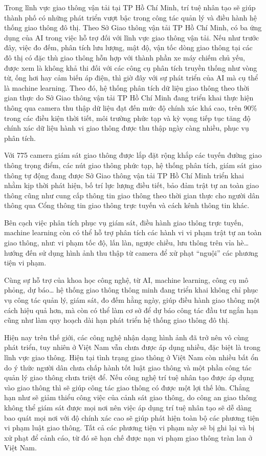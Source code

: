 \documentclass[14pt,oneside,a4paper]{extreport}
\begin{document}
Trong lĩnh vực giao thông vận tải tại TP Hồ Chí Minh, trí tuệ nhân tạo sẽ giúp thành phố có những phát triển vượt bậc trong công tác quản lý và điều hành hệ thống giao thông đô thị. Theo Sở Giao thông vận tải TP Hồ Chí Minh, có ba ứng dụng của AI trong việc hỗ trợ đối với lĩnh vực giao thông vận tải. Nếu như trước đây, việc đo đếm, phân tích lưu lượng, mật độ, vận tốc dòng giao thông tại các đô thị có đặc thù giao thông hỗn hợp với thành phần xe máy chiếm chủ yếu, được xem là không khả thi đối với các công cụ phân tích truyền thống như vòng từ, ống hơi hay cảm biến áp điện, thì giờ đây với sự phát triển của AI mà cụ thể là machine learning. Theo đó, hệ thống phân tích dữ liệu giao thông theo thời gian thực do Sở Giao thông vận tải TP Hồ Chí Minh đang triển khai thực hiện thông qua camera thu thập dữ liệu đạt đến mức độ chính xác khá cao, trên 90\% trong các điều kiện thời tiết, môi trường phức tạp và kỳ vọng tiếp tục tăng độ chính xác dữ liệu hành vi giao thông được thu thập ngày càng nhiều, phục vụ phân tích.

Với 775 camera giám sát giao thông được lắp đặt rộng khắp các tuyến đường giao thông trọng điểm, các nút giao thông phức tạp, hệ thống phân tích, giám sát giao thông tự động đang được Sở Giao thông vận tải TP Hồ Chí Minh triển khai nhằm kịp thời phát hiện, bố trí lực lượng điều tiết, bảo đảm trật tự an toàn giao thông cũng như cung cấp thông tin giao thông theo thời gian thực cho người dân thông qua Cổng thông tin giao thông trực tuyến và cách kênh thông tin khác.

Bên cạch việc phân tích phục vụ giám sát, điều hành giao thông trực tuyến, machine learning còn có thể hỗ trợ phân tích các hành vi vi phạm trật tự an toàn giao thông, như: vi phạm tốc độ, lấn làn, ngược chiều, lưu thông trên vỉa hè… hướng đến sử dụng hình ảnh thu thập từ camera để xử phạt “nguội” các phương tiện vi phạm.

Cùng sự hỗ trợ của khoa học công nghệ, từ AI, machine learning, công cụ mô phỏng, dự báo… hệ thống giao thông thông minh đang triển khai không chỉ phục vụ công tác quản lý, giám sát, đo đếm hằng ngày, giúp điều hành giao thông một cách hiệu quả hơn, mà còn có thể làm cơ sở để dự báo công tác đầu tư ngắn hạn cũng như làm quy hoạch dài hạn phát triển hệ thống giao thông đô thị.

Hiện nay trên thế giới, các công nghệ nhận dạng hình ảnh đã trở nên vô cùng phát triển, tuy nhiên ở Việt Nam vẫn chưa được áp dụng nhiều, đặc biệt là trong lĩnh vực giao thông. Hiện tại tình trạng giao thông ở Việt Nam còn nhiều bất ổn do ý thức người dân chưa chấp hành tốt luật giao thông và một phần công tác quản lý giao thông chưa triệt để. Nếu công nghệ trí tuệ nhân tạo được áp dụng vào giao thông thì sẽ giúp công tác giao thông có được một lợi thế lớn. Chẳng hạn như sẽ giảm thiểu công việc của cảnh sát giao thông, do công an giao thông không thể giám sát được mọi nơi nên việc áp dụng trí tuệ nhân tạo sẽ dễ dàng bao quát mọi nơi với độ chính xác cao sẽ giúp phát hiện toàn bộ các phương tiện vi phạm luật giao thông. Tất cả các phương tiện vi phạm này sẽ bị ghi lại và bị xử phạt để cảnh cáo, từ đó sẽ hạn chế được nạn vi phạm giao thông tràn lan ở Việt Nam.
\end{document}
